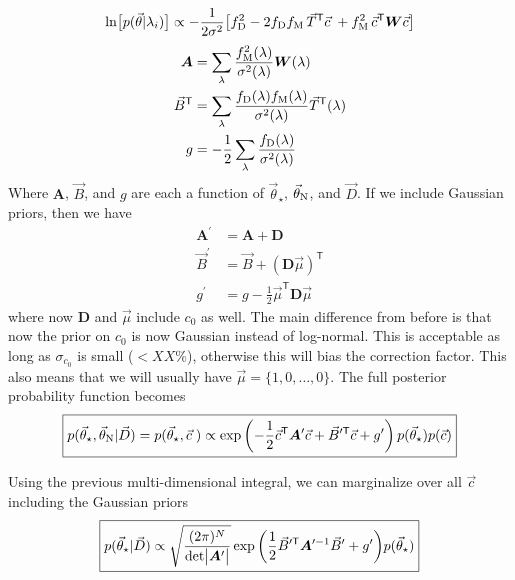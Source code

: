 \documentclass[preprint]{aastex} %
\newcommand{\vt}{\vec{\theta}}
\newcommand{\vstar}{\vt_{\star}}
\newcommand{\vN}{\vt_{\rm N}}
\newcommand{\vc}{\vec{c}}
\newcommand{\fM}{f_{\rm M}}
\newcommand{\fD}{f_{\rm D}}
\newcommand{\vD}{\vec{D}}
\newcommand{\trans}{\mathsf{T}}
\begin{document}
\begin{equation}
  \ln \bigl [p(\vt | \lambda_i) \bigr] \propto -\frac{1}{2 \sigma^2} \bigl [ \fD^2 - 2 \fD \fM\, \vec{T}^\trans \vc \; + \fM^2 \, \vc^\trans {\bm W}  \vc \bigr ]
\end{equation}
\begin{align}
  {\bm A} &= \sum_\lambda \frac{\fM^2(\lambda)}{\sigma^2(\lambda)} {\bm W}(\lambda)\\
  \vec{B}^\trans &= \sum_\lambda \frac{\fD(\lambda) \fM(\lambda) }{\sigma^2(\lambda)} \vec{T}^\trans(\lambda)\\
  g &= -\frac{1}{2} \sum_\lambda \frac{\fD(\lambda)}{\sigma^2(\lambda)}\\
\end{align}
Where ${\bm A}$, $\vec{B}$, and $g$ are each a function of $\vstar$, $\vN$, and $\vD$. If we include Gaussian priors, then we have 
\begin{align}
  {\bm A}^\prime &= {\bm A} + {\bm D}\\
  \vec{B}^\prime &= \vec{B} + ({\bm D} \vec{\mu})^\trans\\
  g^\prime &= g - \frac{1}{2} \vec{\mu}^\trans {\bm D} \vec{\mu} 
\end{align}
where now ${\bm D}$ and $\vec{\mu}$ include $c_0$ as well. The main difference from before is that now the prior on $c_0$ is now Gaussian instead of log-normal. This is acceptable as long as $\sigma_{c_0}$ is small ($< XX\%$), otherwise this will bias the correction factor. This also means that we will usually have $\vec{\mu} = \{1, 0, \ldots, 0\}$. The full posterior probability function becomes
 \begin{equation}
   \boxed{
  p(\vstar, \vN | \vD) = p(\vstar, \vc\;) \propto \exp \left ( - \frac{1}{2} \vc^\trans {\bm A}^\prime \vc + \vec{B}^{\prime \trans} \vc + g^\prime \right ) p(\vstar) p(\vc)
}
\end{equation}

Using the previous multi-dimensional integral, we can marginalize over all $\vc$ including the Gaussian priors
\begin{equation}
  \boxed{
  p(\vstar | \vD) \propto \sqrt{\frac{(2 \pi )^N}{ {\rm det} \bigl |{\bm A}^\prime \bigr |}} \exp{ \left ( \frac{1}{2} \vec{B}^{\prime\trans} {\bm A}^{\prime -1} \vec{B}^\prime + g^\prime \right )} p(\vstar) 
}
\end{equation}
\end{document}
